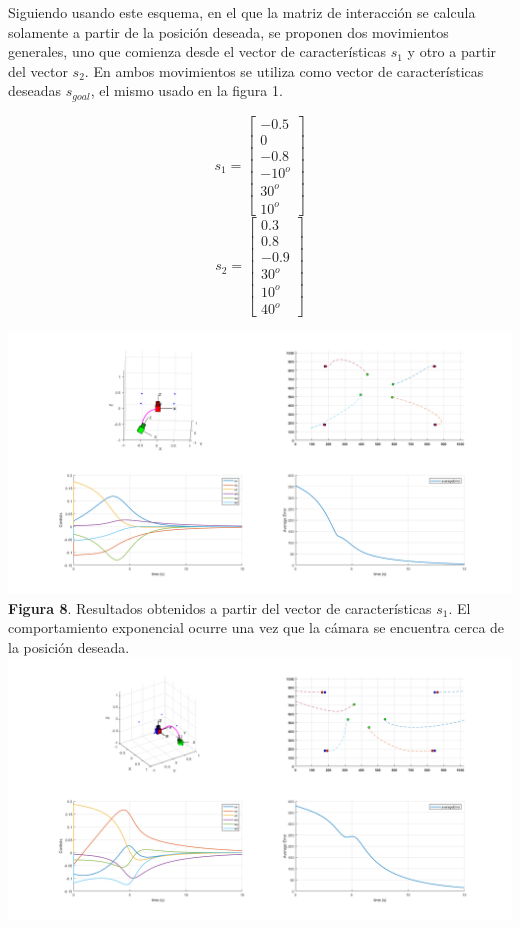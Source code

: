 \documentclass{article}
\begin{document}
	Siguiendo usando este esquema, en el que la matriz de interacci\'on se calcula solamente a partir de la posici\'on deseada, se proponen dos movimientos generales, uno que comienza desde el vector de caracter\'isticas $s_1$ y otro a partir del vector $s_2$. En ambos movimientos se utiliza como vector de caracter\'isticas deseadas $s_{goal}$, el mismo usado en la figura 1.
	\begin{center}
	\begin{multicols}{2}
	$$
	s_{1} = \left[\begin{matrix}
	-0.5\\0\\-0.8\\-10^o\\30^o\\10^o
	\end{matrix}\right]
	$$
	$$
	s_{2} = \left[\begin{matrix}
	0.3\\0.8\\-0.9\\30^o\\10^o\\40^o
	\end{matrix}\right]
	$$
	\end{multicols}
	\includegraphics[scale=0.3]{fig3_1.png}\\
	{\footnotesize \textbf{Figura 8}. Resultados obtenidos a partir del vector de caracter\'isticas $s_1$. El comportamiento exponencial ocurre una vez que la c\'amara se encuentra cerca de la posici\'on deseada.}\\
	\includegraphics[scale=0.3]{fig3_2.png}\\

\end{center}
\end{document}
